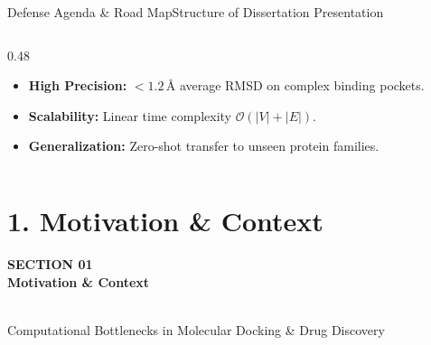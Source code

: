 \documentclass[10pt,aspectratio=169]{beamer}
\begin{document}
\begin{frame}{Defense Agenda \& Road Map}{Structure of Dissertation Presentation}
\begin{columns}[T]
\begin{column}{0.48\textwidth}
\begin{tcolorbox}[highlightbox,title={\faLightbulb \quad Core Thesis Contribution}]
        \tiny
        \begin{itemize}
          \item \textbf{High Precision:} $<1.2\,\text{\AA}$ average RMSD on complex binding pockets.
          \item \textbf{Scalability:} Linear time complexity $\mathcal{O}(|V| + |E|)$.
          \item \textbf{Generalization:} Zero-shot transfer to unseen protein families.
        \end{itemize}
      \end{tcolorbox}
    \end{column}
  \end{columns}
\end{frame}

\section{1. Motivation \& Context}
{
\begin{frame}[plain]
  \vfill
  \begin{center}
    {\tiny\color{AmberAccent}\bfseries SECTION 01} \\[4pt]
    {\Huge\bfseries\color{White} Motivation \& Context} \\[8pt]
     \\[8pt]
    {\small\color{CardBorder} Computational Bottlenecks in Molecular Docking \& Drug Discovery}
  \end{center}
  \vfill
\end{frame}
}
\end{document}
